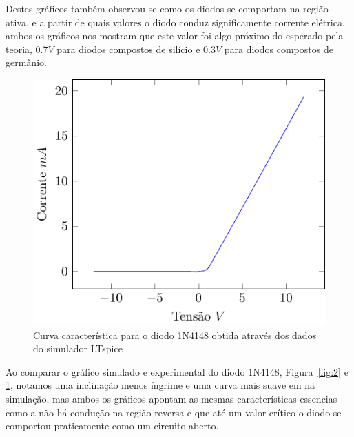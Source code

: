 \documentclass[12pt,a4paper]{article}
\begin{document}
Destes gráficos também observou-se como os diodos se comportam na região ativa, e a partir de quais valores o diodo conduz significamente corrente elétrica, ambos os gráficos nos mostram que este valor foi algo próximo do esperado pela teoria, $0.7V$ para diodos compostos de silício e $0.3V$ para diodos compostos de germânio. 
\begin{figure}[htpb]
  \centering
  \includegraphics[width=0.8\linewidth]{spice_graphic.pdf}
  \caption{Curva característica para o diodo 1N4148 obtida através dos dados do simulador LTspice}
  \label{fig:spice_graphic}
\end{figure}
Ao comparar o gráfico simulado e experimental do diodo 1N4148, Figura~\ref{fig:2} e \ref{fig:spice_graphic}, notamos uma inclinação menos íngrime e uma curva mais suave em na simulação, mas ambos os gráficos apontam as mesmas características essencias como a não há condução na região reversa e que até um valor crítico o diodo se comportou praticamente como um  circuito aberto.
\end{document}
